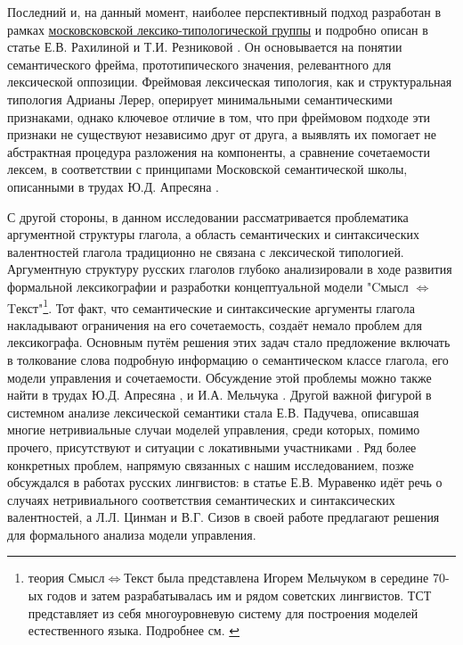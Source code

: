 \begin{enumerate*}[itemjoin={\hskip3mm},after=\hskip3mm,before=\hskip3mm]
    \item Последний и, на данный момент, наиболее перспективный подход разработан в рамках \hyperlink{mlext}{московсковской лексико-типологической группы} и подробно описан в статье Е.В. Рахилиной и Т.И. Резниковой \citep{rakhilina2016frame}. Он основывается на понятии семантического фрейма, прототипического значения, релевантного для лексической оппозиции. Фреймовая лексическая типология, как и структуральная типология Адрианы Лерер, оперирует минимальными семантическими признаками, однако ключевое отличие в том, что при фреймовом подходе эти признаки не существуют независимо друг от друга, а выявлять их помогает не абстрактная процедура разложения на компоненты, а сравнение сочетаемости лексем, в соответствии с принципами Московской семантической школы, описанными в трудах Ю.Д. Апресяна  \citep{апресян1995избранные}.
\end{enumerate*}
С другой стороны, в данном исследовании рассматривается проблематика аргументной структуры глагола, а область семантических и синтаксических валентностей глагола традиционно не связана с лексической типологией. Аргументную структуру русских глаголов глубоко анализировали в ходе развития формальной лексикографии и разработки концептуальной модели "Cмысл $\Leftrightarrow$ Tекст"\footnote{теория Смысл$\Leftrightarrow$Текст была представлена Игорем Мельчуком в середине 70-ых годов и затем разрабатывалась им и рядом советских лингвистов. ТСТ представляет из себя многоуровневую систему для построения моделей естественного языка. Подробнее см. \citep{мельчук1974опыт}}. Тот факт, что семантические и синтаксические аргументы глагола накладывают ограничения на его сочетаемость, создаёт немало проблем для лексикографа. Основным путём решения этих задач стало предложение включать в толкование слова подробную информацию о семантическом классе глагола, его модели управления и сочетаемости. Обсуждение этой проблемы можно также найти в трудах Ю.Д. Апресяна \citep[119-156]{апресян1995избранные}, \citep[129-131]{апресян1995избранные2} и И.А. Мельчука \citep[134–139]{мельчук1974опыт}. Другой важной фигурой в системном анализе лексической семантики стала Е.В. Падучева, описавшая многие нетривиальные случаи моделей управления, среди которых, помимо прочего, присутствуют и ситуации с локативными участниками \citep{падучева2004динамические, падучева2012неопределенно}. Ряд более конкретных проблем, напрямую связанных с нашим исследованием, позже обсуждался в работах русских лингвистов: в статье Е.В. Муравенко  \citep{муравенко1998случаях} идёт речь о случаях нетривиального соответствия семантических и синтаксических валентностей, а Л.Л. Цинман и В.Г. Сизов \citep{цинман1998модель} в своей работе предлагают решения для формального анализа модели управления. 

